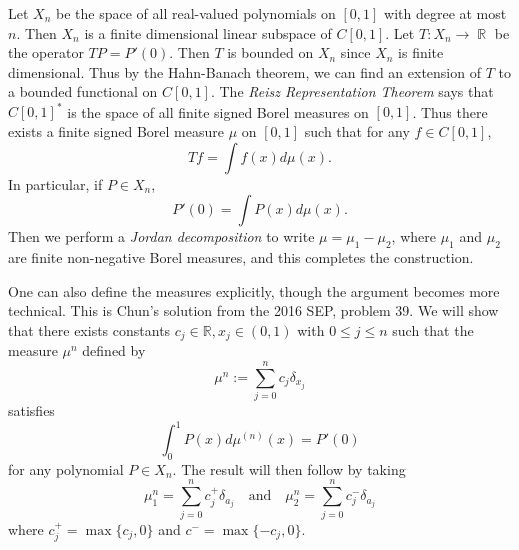 \documentclass[answers]{exam}
\DeclareMathOperator{\RR}{\mathbb{R}}
\theoremstyle{problemstyle}
\newcommand{\1}[1]{\textbf{1}_{\left[#1\right]}} %
\def\R{\mathbb{R}} %
\begin{document}
\begin{questions}
\begin{parts}
\begin{solution}
	Let $X_n$ be the space of all real-valued polynomials on $[0,1]$ with degree at most $n$. Then $X_n$ is a finite dimensional linear subspace of $C[0,1]$. Let $T: X_n \to \RR$ be the operator $TP = P'(0)$. Then $T$ is bounded on $X_n$ since $X_n$ is finite dimensional. Thus by the Hahn-Banach theorem, we can find an extension of $T$ to a bounded functional on $C[0,1]$. The \emph{Reisz Representation Theorem} says that $C[0,1]^*$ is the space of all finite signed Borel measures on $[0,1]$. Thus there exists a finite signed Borel measure $\mu$ on $[0,1]$ such that for any $f \in C[0,1]$,
	\[ Tf = \int f(x) d\mu(x). \]
	In particular, if $P \in X_n$,
	\[ P'(0) = \int P(x) d\mu(x). \]
	Then we perform a \emph{Jordan decomposition} to write $\mu = \mu_1 - \mu_2$, where $\mu_1$ and $\mu_2$ are finite non-negative Borel measures, and this completes the construction.

	One can also define the measures explicitly, though the argument becomes more technical. This is Chun's solution from the 2016 SEP, problem 39. We will show that there exists constants $c_{j}\in \R, x_{j}\in (0,1)$ with $0\leq j\leq n$ such that the measure $\mu^{n}$ defined by
  \begin{equation}\label{eq:mu-form}
    \mu^{n}:= \sum_{j=0}^{n}c_{j}\delta_{x_{j}}
  \end{equation}
  satisfies
  \[ \int_0^1 P(x) d\mu^{(n)}(x) = P'(0) \]
  for any polynomial $P \in X_n$. The result will then follow by taking
  \begin{equation*}
    \mu_{1}^{n} = \sum_{j=0}^{n}c_{j}^{+}\delta_{a_{j}} \quad \text{and}\quad    \mu_{2}^{n} = \sum_{j=0}^{n}c_{j}^{-}\delta_{a_{j}}
  \end{equation*}
  where $c_{j}^{+}=\max\{c_{j},0\}$ and $c^{-}= \max\{-c_{j},0\}$.


\end{solution}
\end{parts}
\end{questions}
\end{document}
